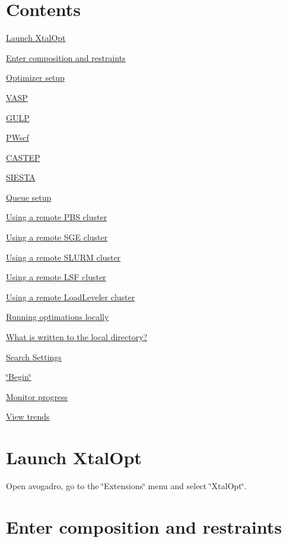 \hypertarget{tut-xo_Contents}{}\section{Contents}\label{tut-xo_Contents}

\begin{DoxyItemize}
\item \hyperlink{tut-xo_launch}{Launch Xtal\+Opt}
\item \hyperlink{tut-xo_init}{Enter composition and restraints}
\item \hyperlink{tut-xo_opt}{Optimizer setup}
\begin{DoxyItemize}
\item \hyperlink{tut-xo_vasp-opt}{V\+A\+S\+P}
\item \hyperlink{tut-xo_gulp-opt}{G\+U\+L\+P}
\item \hyperlink{tut-xo_pwscf-opt}{P\+Wscf}
\item \hyperlink{tut-xo_castep-opt}{C\+A\+S\+T\+E\+P}
\item \hyperlink{tut-xo_siesta-opt}{S\+I\+E\+S\+T\+A}
\end{DoxyItemize}
\item \hyperlink{tut-xo_qisetup}{Queue setup}
\begin{DoxyItemize}
\item \hyperlink{tut-xo_remotepbs}{Using a remote P\+B\+S cluster}
\item \hyperlink{tut-xo_remotesge}{Using a remote S\+G\+E cluster}
\item \hyperlink{tut-xo_remoteslurm}{Using a remote S\+L\+U\+R\+M cluster}
\item \hyperlink{tut-xo_remotelsf}{Using a remote L\+S\+F cluster}
\item \hyperlink{tut-xo_remotell}{Using a remote Load\+Leveler cluster}
\item \hyperlink{tut-xo_localqi}{Running optimations locally}
\end{DoxyItemize}
\item \hyperlink{tut-xo_files}{What is written to the local directory?}
\item \hyperlink{tut-xo_search-set}{Search Settings}
\item \hyperlink{tut-xo_begin}{\char`\"{}\+Begin\char`\"{}}
\item \hyperlink{tut-xo_prog-mon}{Monitor progress}
\begin{DoxyItemize}
\item \hyperlink{tut-xo_trends}{View trends}
\end{DoxyItemize}
\end{DoxyItemize}\hypertarget{tut-xo_launch}{}\section{Launch Xtal\+Opt}\label{tut-xo_launch}
Open avogadro, go to the \char`\"{}\+Extensions\char`\"{} menu and select \char`\"{}\+Xtal\+Opt\char`\"{}.\hypertarget{tut-xo_init}{}\section{Enter composition and restraints}\label{tut-xo_init}
 
